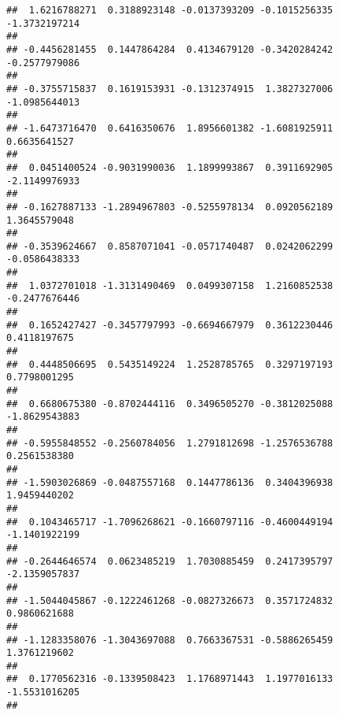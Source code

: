 \documentclass[]{article}
\begin{document}
\begin{verbatim}
##  1.6216788271  0.3188923148 -0.0137393209 -0.1015256335 -1.3732197214 
##                                                                       
## -0.4456281455  0.1447864284  0.4134679120 -0.3420284242 -0.2577979086 
##                                                                       
## -0.3755715837  0.1619153931 -0.1312374915  1.3827327006 -1.0985644013 
##                                                                       
## -1.6473716470  0.6416350676  1.8956601382 -1.6081925911  0.6635641527 
##                                                                       
##  0.0451400524 -0.9031990036  1.1899993867  0.3911692905 -2.1149976933 
##                                                                       
## -0.1627887133 -1.2894967803 -0.5255978134  0.0920562189  1.3645579048 
##                                                                       
## -0.3539624667  0.8587071041 -0.0571740487  0.0242062299 -0.0586438333 
##                                                                       
##  1.0372701018 -1.3131490469  0.0499307158  1.2160852538 -0.2477676446 
##                                                                       
##  0.1652427427 -0.3457797993 -0.6694667979  0.3612230446  0.4118197675 
##                                                                       
##  0.4448506695  0.5435149224  1.2528785765  0.3297197193  0.7798001295 
##                                                                       
##  0.6680675380 -0.8702444116  0.3496505270 -0.3812025088 -1.8629543883 
##                                                                       
## -0.5955848552 -0.2560784056  1.2791812698 -1.2576536788  0.2561538380 
##                                                                       
## -1.5903026869 -0.0487557168  0.1447786136  0.3404396938  1.9459440202 
##                                                                       
##  0.1043465717 -1.7096268621 -0.1660797116 -0.4600449194 -1.1401922199 
##                                                                       
## -0.2644646574  0.0623485219  1.7030885459  0.2417395797 -2.1359057837 
##                                                                       
## -1.5044045867 -0.1222461268 -0.0827326673  0.3571724832  0.9860621688 
##                                                                       
## -1.1283358076 -1.3043697088  0.7663367531 -0.5886265459  1.3761219602 
##                                                                       
##  0.1770562316 -0.1339508423  1.1768971443  1.1977016133 -1.5531016205 
##                                                                       

\end{verbatim}
\end{document}
